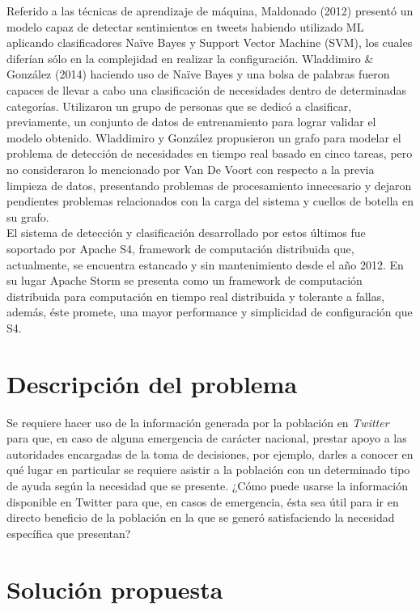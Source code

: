 Referido a las técnicas de aprendizaje de máquina, Maldonado (2012) presentó un modelo capaz de detectar sentimientos en tweets habiendo utilizado ML aplicando clasificadores Naïve Bayes y Support Vector Machine (SVM), los cuales diferían sólo en la complejidad en realizar la configuración. Wladdimiro \& González (2014) haciendo uso de Naïve Bayes y una bolsa de palabras fueron capaces de llevar a cabo una clasificación de necesidades dentro de determinadas categorías. Utilizaron un grupo de personas que se dedicó a clasificar, previamente, un conjunto de datos de entrenamiento para lograr validar el modelo obtenido. Wladdimiro y González propusieron un grafo para modelar el problema de detección de necesidades en tiempo real basado en cinco tareas, pero no consideraron lo mencionado por Van De Voort con respecto a la previa limpieza de datos, presentando problemas de procesamiento innecesario y dejaron pendientes problemas relacionados con la carga del sistema y cuellos de botella en su grafo.\\

El sistema de detección y clasificación desarrollado por estos últimos fue soportado por Apache S4, framework de computación distribuida que, actualmente, se encuentra estancado y sin mantenimiento desde el año 2012. En su lugar Apache Storm se presenta como un framework de computación distribuida para computación en tiempo real distribuida y tolerante a fallas, además, éste promete, una mayor performance y simplicidad de configuración que S4.\\


\section{Descripci\'on del problema}
\label{intro:problema}

Se requiere hacer uso de la información generada por la población en \textit{Twitter} para que, en caso de alguna emergencia de carácter nacional, prestar apoyo a las autoridades encargadas de la toma de decisiones, por ejemplo, darles a conocer en qué lugar en particular se requiere asistir a la población con un determinado tipo de ayuda según la necesidad que se presente. ¿Cómo puede usarse la información disponible en Twitter para que, en casos de emergencia, ésta sea útil para ir en directo beneficio de la población en la que se generó satisfaciendo la necesidad específica que presentan?\\

\section{Soluci\'on propuesta}
\label{intro:solucion}

